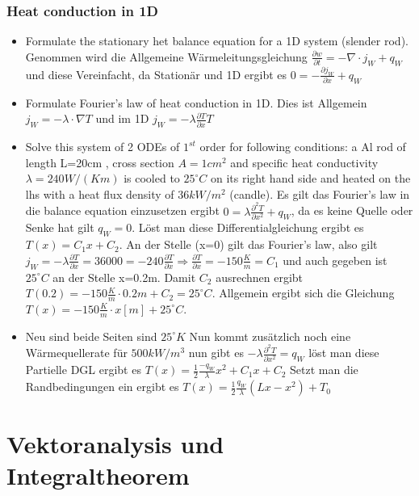 \documentclass[a4paper, 10pt]{scrartcl}
\begin{document}
		\subsubsection{Heat conduction in 1D}
		\begin{itemize}
			
			\item Formulate the stationary het balance equation for a 1D system (slender rod). Genommen wird die Allgemeine Wärmeleitungsgleichung $\frac{\partial w}{\partial t}= -\nabla \cdot j_W+q_W$ und diese Vereinfacht, da Stationär und 1D ergibt es $0= -\frac{\partial j_W}{\partial x}+q_W$
			
			\item Formulate Fourier's law of heat conduction in 1D. Dies ist Allgemein $j_W=-\lambda \cdot \nabla T$ und im 1D $j_W=-\lambda \frac{\partial T}{\partial x} T$
			
			\item Solve this system of 2 ODEs of $1^{st}$ order for following conditions: a Al rod of length L=20cm , cross section $A=1cm^2$ and specific heat conductivity 
			$ \lambda = 240 W/(Km) $ 
			is cooled to $25^\circ C$ on its right hand side and heated on the lhs with a heat flux density of $ 36 kW/m^2 $ (candle).
			Es gilt das Fourier's law in die balance equation einzusetzen ergibt $ 0=\lambda \frac{\partial^2T}{\partial x^2}+q_W$, da es keine Quelle oder Senke hat gilt $q_W=0$. Löst man diese Differentialgleichung ergibt es $T(x)=C_1x+C_2$. An der Stelle (x=0) gilt das Fourier's law, also gilt $j_W=-\lambda \frac{\partial T}{\partial x} = 36000 = -240 \frac{\partial T}{\partial x } \Rightarrow \frac{\partial T}{\partial x}=-150 \frac{K}{m} =C_1$ und auch gegeben ist $25^\circ C$ an der Stelle x=0.2m. Damit $C_2$ ausrechnen ergibt  $ T(0.2)= -150 \frac{K}{m} \cdot 0.2m+C_2=25^{\circ} C $. Allgemein ergibt sich die Gleichung $ T(x)= -150 \frac{K}{m} \cdot x [m] + 25^{\circ} C $.
			
			\item Neu sind beide Seiten sind $25^\circ K$ Nun kommt zusätzlich noch eine Wärmequellerate für $500 kW/m^3$ nun gibt es $ -\lambda \frac{\partial^2T}{\partial x^2}=q_W$ löst man diese Partielle DGL ergibt es $T(x)=\frac{1}{2}\frac{-q_W}{\lambda} x^2+C_1x+C_2$ Setzt man die Randbedingungen ein ergibt es $T(x)=\frac{1}{2}\frac{q_W}{\lambda}(Lx-x^2)+T_0$
			
			
		\end{itemize}
		
		
		\section{Vektoranalysis und Integraltheorem}
\end{document}
